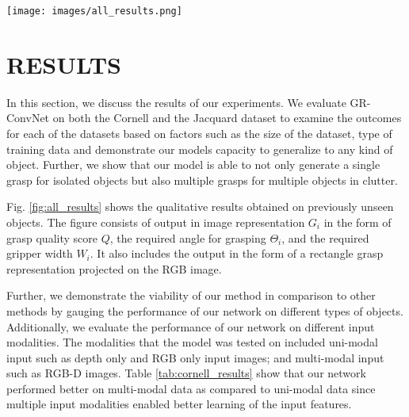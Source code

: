 \documentclass[letterpaper, 10pt, conference]{IEEEtran}
\begin{document}
\begin{figure*}
    \centering
    \texttt{[image: images/all\_results.png]}  
    \caption{Qualitative results. Quality, angle and width are the output of GR-ConNet which are used to infer grasp rectangle. (a) Unseen objects from Cornell dataset (b) Unseen objects from Jacquard dataset (c) Single household object (d) Multiple grasps for multiple objects (e) Poor grasp for transparent object}
    \label{fig:all_results}
\end{figure*}

\section{RESULTS} \label{results}
In this section, we discuss the results of our experiments. We evaluate GR-ConvNet on both the Cornell and the Jacquard dataset to examine the outcomes for each of the datasets based on factors such as the size of the dataset, type of training data and demonstrate our model\textquotesingle s capacity to generalize to any kind of object. Further, we show that our model is able to not only generate a single grasp for isolated objects but also multiple grasps for multiple objects in clutter.

Fig. \ref{fig:all_results} shows the qualitative results obtained on previously unseen objects. The figure consists of output in image representation $G_i$ in the form of grasp quality score $Q$, the required angle for grasping $\Theta_i$, and the required gripper width $W_i$. It also includes the output in the form of a rectangle grasp representation projected on the RGB image.



Further, we demonstrate the viability of our method in comparison to other methods by gauging the performance of our network on different types of objects. Additionally, we evaluate the performance of our network on different input modalities. The modalities that the model was tested on included uni-modal input such as depth only and RGB only input images; and multi-modal input such as RGB-D images. Table \ref{tab:cornell_results} show that our network performed better on multi-modal data as compared to uni-modal data since multiple input modalities enabled better learning of the input features.
\end{document}
